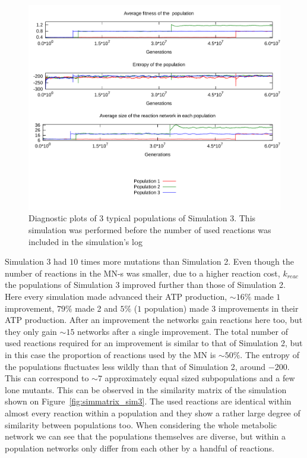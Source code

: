 \documentclass[a4paper,12pt]{article}
\begin{document}
\begin{figure}[htpb]
	\centering
	\includegraphics[width=0.8\linewidth]{simulation3.pdf}
	\caption{Diagnostic plots of 3 typical populations of Simulation 3. This simulation was performed before the number of used reactions was included in the simulation's log}
	\label{fig:simulation3}
\end{figure}

Simulation 3 had $10$ times more mutations than Simulation 2. Even though the number of reactions in the MN-s was smaller, due to a higher reaction cost, $k_{reac}$ the populations of Simulation 3 improved further than those of Simulation 2. Here every simulation made advanced their ATP production, $\sim 16\%$ made $1$ improvement, $79\%$ made 2 and $5\%$ ($1$ population) made $3$ improvements in their ATP production. After an improvement the networks gain reactions here too, but they only gain $\sim 15$ networks after a single improvement. The total number of used reactions required for an improvement is similar to that of Simulation 2, but in this case the proportion of reactions used by the MN is $\sim 50\%$. The entropy of the populations fluctuates less wildly than that of Simulation 2, around $-200$. This can correspond to $\sim 7$ approximately equal sized subpopulations and a few lone mutants. This can be observed in the similarity matrix of the simulation shown on Figure~\ref{fig:simmatrix_sim3}. The used reactions are identical within almost every reaction within a population and they show a rather large degree of similarity between populations too. When considering the whole metabolic network we can see that the populations themselves are diverse, but within a population networks only differ from each other by a handful of reactions. 
\end{document}
